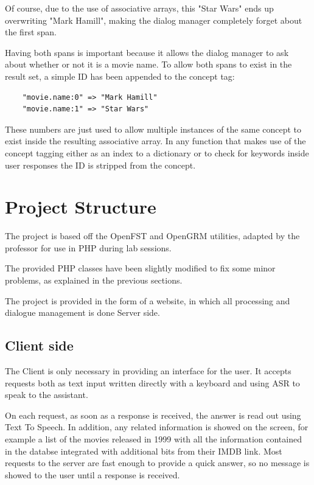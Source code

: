 \documentclass[11pt,a4paper]{article}
\begin{document}
Of course, due to the use of associative arrays, this "Star Wars" ends up overwriting "Mark Hamill", making the dialog manager completely forget about the first span.

Having both spans is important because it allows the dialog manager to ask about whether or not it is a movie name.
To allow both spans to exist in the result set, a simple ID has been appended to the concept tag:

\begin{verbatim}
	"movie.name:0" => "Mark Hamill"
	"movie.name:1" => "Star Wars"
\end{verbatim}

These numbers are just used to allow multiple instances of the same concept to exist inside the resulting associative array. In any function that makes use of the concept tagging either as an index to a dictionary or to check for keywords inside user responses the ID is stripped from the concept.

\section{Project Structure}

The project is based off the OpenFST and OpenGRM utilities, adapted by the professor for use in PHP during lab sessions.

The provided PHP classes have been slightly modified to fix some minor problems, as explained in the previous sections.

The project is provided in the form of a website, in which all processing and dialogue management is done Server side.

\subsection{Client side}
The Client is only necessary in providing an interface for the user. It accepts requests both as text input written directly with a keyboard and using ASR to speak to the assistant.

On each request, as soon as a response is received, the answer is read out using Text To Speech. In addition, any related information is showed on the screen, for example a list of the movies released in 1999 with all the information contained in the databse integrated with additional bits from their IMDB link. Most requests to the server are fast enough to provide a quick answer, so no message is showed to the user until a response is received.
\end{document}
